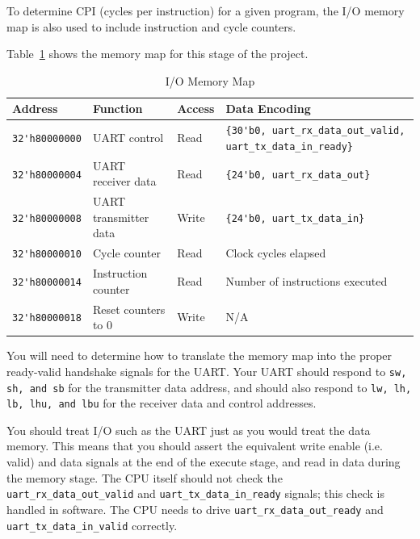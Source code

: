 \documentclass[11pt]{article}
\begin{document}
To determine CPI (cycles per instruction) for a given program, the I/O memory map is also used to include instruction and cycle counters.

Table~\ref{mem_map1} shows the memory map for this stage of the project.

\begin{table}[hbt]
  \begin{center}
    \caption{I/O Memory Map}
    \label{mem_map1}
    \begin{adjustbox}{width=\columnwidth,center}
    \begin{tabular}{l l l l}
      \toprule
      \textbf{Address} & \textbf{Function} & \textbf{Access} & \textbf{Data Encoding}\\
      \midrule
      \verb|32'h80000000| & UART control & Read & \verb|{30'b0, uart_rx_data_out_valid, uart_tx_data_in_ready}| \\
      \verb|32'h80000004| & UART receiver data & Read & \verb|{24'b0, uart_rx_data_out}| \\
      \verb|32'h80000008| & UART transmitter data & Write & \verb|{24'b0, uart_tx_data_in}| \\
      \midrule
      \verb|32'h80000010| & Cycle counter & Read & Clock cycles elapsed \\
      \verb|32'h80000014| & Instruction counter & Read & Number of instructions executed \\
      \verb|32'h80000018| & Reset counters to 0 & Write & N/A \\
      \bottomrule
    \end{tabular}
    \end{adjustbox}
  \end{center}
\end{table}

You will need to determine how to translate the memory map into the proper ready-valid handshake signals for the UART.
Your UART should respond to \verb|sw, sh, and sb| for the transmitter data address, and should also respond to \verb|lw, lh, lb, lhu, and lbu| for the receiver data and control addresses.

You should treat I/O such as the UART just as you would treat the data memory.
This means that you should assert the equivalent write enable (i.e. valid) and data signals at the end of the execute stage, and read in data during the memory stage.
The CPU itself should not check the \verb|uart_rx_data_out_valid| and \verb|uart_tx_data_in_ready| signals; this check is handled in software.
The CPU needs to drive \verb|uart_rx_data_out_ready| and \verb|uart_tx_data_in_valid| correctly.
\end{document}
